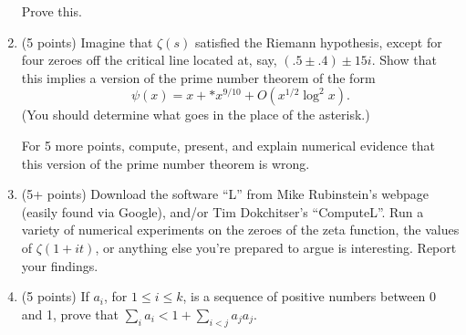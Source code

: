 \documentclass[12pt]{article}
\begin{document}
\begin{enumerate}
Prove this. 

\item(5 points)
Imagine that $\zeta(s)$ satisfied the Riemann hypothesis, except for four zeroes off the
critical line located at, say, $(.5 \pm .4) \pm 15i$. Show that this implies 
a version of the prime number theorem of the form
\begin{equation}
\psi(x) = x + \ast x^{9/10} + O(x^{1/2} \log^2 x).
\end{equation}
(You should determine what goes in the place of the asterisk.)

For 5 more points, compute, present, and explain numerical evidence that this version of the
prime number theorem is wrong. 

\item(5+ points)
Download the software ``L'' from Mike Rubinstein's webpage (easily found via Google),
and/or Tim Dokchitser's ``ComputeL''.
Run a variety of numerical experiments on the zeroes of the zeta function,
the values of $\zeta(1 + it)$, or anything else you're prepared to argue is
interesting. Report your findings.

\item(5 points)
If $a_i$, for $1 \leq i \leq k$, is a sequence of positive numbers between 0 and 1,
prove that $\sum_i a_i < 1 + \sum_{i < j} a_j a_j$.

\end{enumerate}
\end{document}
